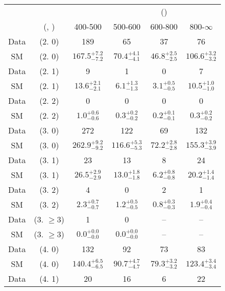 \begin{table}[h!]
\tiny
\centering
{}
\begin{tabular}
{cccccc}
	\hline\hline
&	&	& \multicolumn{4}{c}{\scalht (\gev)}\\ 
	&	 (\njet, \nb) & 400-500 & 500-600 & 600-800 & 800-$\infty$ \\ [0.8ex] 
\hline
	Data & (2. 0) & 189 & 65 & 37 & 76 \\[0.5ex] 
	SM & (2. 0) & $167.5^{+ 7.2 }_{- 7.2 }$ & $70.4^{+ 4.1 }_{- 4.1 }$ & $46.8^{+ 2.5 }_{- 2.5 }$ & $106.6^{+ 3.2 }_{- 3.2 }$ \\[0.5ex] 
	Data & (2. 1) & 9 & 1 & 0 & 7 \\[0.5ex] 
	SM & (2. 1) & $13.6^{+ 2.1 }_{- 2.1 }$ & $6.1^{+ 1.3 }_{- 1.3 }$ & $3.1^{+ 0.5 }_{- 0.5 }$ & $10.5^{+ 1.0 }_{- 1.0 }$ \\[0.5ex] 
	Data & (2. 2) & 0 & 0 & 0 & 0 \\[0.5ex] 
	SM & (2. 2) & $1.0^{+ 0.6 }_{- 0.6 }$ & $0.3^{+ 0.2 }_{- 0.2 }$ & $0.2^{+ 0.1 }_{- 0.1 }$ & $0.3^{+ 0.2 }_{- 0.2 }$ \\[0.5ex] 
	Data & (3. 0) & 272 & 122 & 69 & 132 \\[0.5ex] 
	SM & (3. 0) & $262.9^{+ 9.2 }_{- 9.2 }$ & $116.6^{+ 5.3 }_{- 5.3 }$ & $72.2^{+ 2.8 }_{- 2.8 }$ & $155.3^{+ 3.9 }_{- 3.9 }$ \\[0.5ex] 
	Data & (3. 1) & 23 & 13 & 8 & 24 \\[0.5ex] 
	SM & (3. 1) & $26.5^{+ 2.9 }_{- 2.9 }$ & $13.0^{+ 1.8 }_{- 1.8 }$ & $6.2^{+ 0.8 }_{- 0.8 }$ & $20.2^{+ 1.4 }_{- 1.4 }$ \\[0.5ex] 
	Data & (3. 2) & 4 & 0 & 2 & 1 \\[0.5ex] 
	SM & (3. 2) & $2.3^{+ 0.7 }_{- 0.7 }$ & $1.2^{+ 0.5 }_{- 0.5 }$ & $0.8^{+ 0.3 }_{- 0.3 }$ & $1.9^{+ 0.4 }_{- 0.4 }$ \\[0.5ex] 
	Data & (3. $\ge3$) & 1 & 0 & -- & -- \\[0.5ex] 
	SM & (3. $\ge3$) & $0.0^{+ 0.0 }_{- 0.0 }$ & $0.0^{+ 0.0 }_{- 0.0 }$ & -- & -- \\[0.5ex] 
	Data & (4. 0) & 132 & 92 & 73 & 83 \\[0.5ex] 
	SM & (4. 0) & $140.4^{+ 6.5 }_{- 6.5 }$ & $90.7^{+ 4.7 }_{- 4.7 }$ & $79.3^{+ 3.2 }_{- 3.2 }$ & $123.4^{+ 3.4 }_{- 3.4 }$ \\[0.5ex] 
	Data & (4. 1) & 20 & 16 & 6 & 22 \\[0.5ex] 

\end{tabular}
\end{table}
